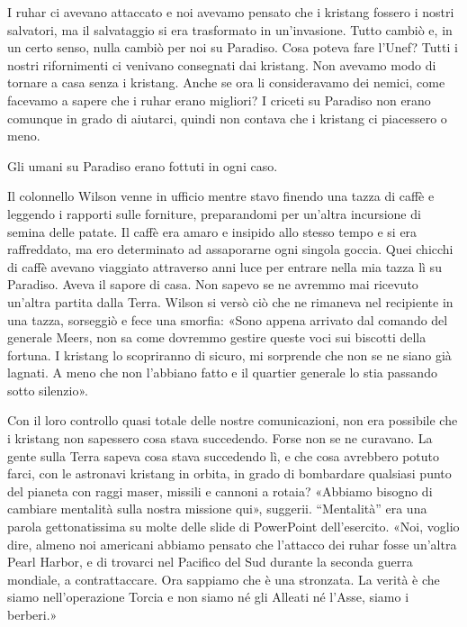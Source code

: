 I ruhar ci avevano attaccato e noi avevamo pensato che i kristang
fossero i nostri salvatori, ma il salvataggio si era trasformato in
un'invasione. Tutto cambiò e, in un certo senso, nulla cambiò per noi su
Paradiso. Cosa poteva fare l'Unef? Tutti i nostri rifornimenti ci
venivano consegnati dai kristang. Non avevamo modo di tornare a casa
senza i kristang. Anche se ora li consideravamo dei nemici, come
facevamo a sapere che i ruhar erano migliori? I criceti su Paradiso non
erano comunque in grado di aiutarci, quindi non contava che i kristang
ci piacessero o meno.

Gli umani su Paradiso erano fottuti in ogni caso.

\hfill\break

Il colonnello Wilson venne in ufficio mentre stavo finendo una tazza di
caffè e leggendo i rapporti sulle forniture, preparandomi per un'altra
incursione di semina delle patate. Il caffè era amaro e insipido allo
stesso tempo e si era raffreddato, ma ero determinato ad assaporarne
ogni singola goccia. Quei chicchi di caffè avevano viaggiato attraverso
anni luce per entrare nella mia tazza lì su Paradiso. Aveva il sapore di
casa. Non sapevo se ne avremmo mai ricevuto un'altra partita dalla
Terra. Wilson si versò ciò che ne rimaneva nel recipiente in una tazza,
sorseggiò e fece una smorfia: «Sono appena arrivato dal comando del
generale Meers, non sa come dovremmo gestire queste voci sui biscotti
della fortuna. I kristang lo scopriranno di sicuro, mi sorprende che non
se ne siano già lagnati. A meno che non l'abbiano fatto e il quartier
generale lo stia passando sotto silenzio».

Con il loro controllo quasi totale delle nostre comunicazioni, non era
possibile che i kristang non sapessero cosa stava succedendo. Forse non
se ne curavano. La gente sulla Terra sapeva cosa stava succedendo lì, e
che cosa avrebbero potuto farci, con le astronavi kristang in orbita, in
grado di bombardare qualsiasi punto del pianeta con raggi maser, missili
e cannoni a rotaia? «Abbiamo bisogno di cambiare mentalità sulla nostra
missione qui», suggerii. ``Mentalità'' era una parola gettonatissima su
molte delle slide di PowerPoint dell'esercito. «Noi, voglio dire, almeno
noi americani abbiamo pensato che l'attacco dei ruhar fosse un'altra
Pearl Harbor, e di trovarci nel Pacifico del Sud durante la seconda
guerra mondiale, a contrattaccare. Ora sappiamo che è una stronzata. La
verità è che siamo nell'operazione Torcia e non siamo né gli Alleati né
l'Asse, siamo i berberi.»

